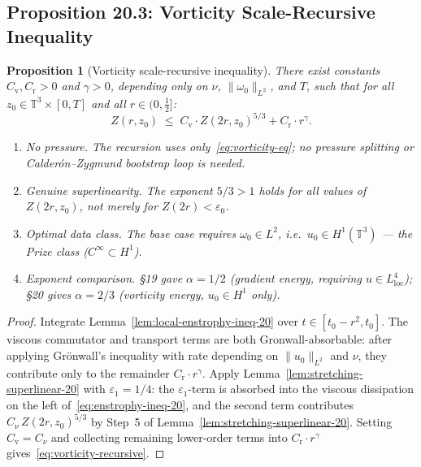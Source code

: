 \documentclass[11pt]{article}
\newtheorem{proposition}[theorem]{Proposition}
\theoremstyle{definition}
\theoremstyle{remark}
\newcommand{\T}{\mathbb{T}}
\begin{document}
\subsection{Proposition 20.3: Vorticity Scale-Recursive Inequality}

\begin{proposition}[Vorticity scale-recursive inequality]
  \label{prop:vorticity-recursive-20}
  There exist constants $C_{\mathrm{v}}, C_{\mathrm{r}} > 0$ and $\gamma > 0$,
  depending only on $\nu$, $\|\omega_0\|_{L^2}$, and $T$, such that for all
  $z_0\in\T^3\times[0,T]$ and all $r\in(0,\tfrac{1}{2}]$:
  \begin{equation}\label{eq:vorticity-recursive}
    Z(r,z_0) \;\leq\; C_{\mathrm{v}}\cdot Z(2r,z_0)^{5/3} + C_{\mathrm{r}}\cdot r^\gamma.
  \end{equation}
  \begin{enumerate}[label=(\alph*)]
    \item \emph{No pressure.}  The recursion uses only~\eqref{eq:vorticity-eq};
    no pressure splitting or Calderón--Zygmund bootstrap loop is needed.
    \item \emph{Genuine superlinearity.}  The exponent $5/3>1$ holds for
    \emph{all} values of $Z(2r,z_0)$, not merely for $Z(2r)<\varepsilon_0$.
    \item \emph{Optimal data class.}  The base case requires $\omega_0\in L^2$,
    i.e.\ $u_0\in H^1(\T^3)$ — the Prize class ($C^\infty\subset H^1$).
    \item \emph{Exponent comparison.}  §19 gave $\alpha=1/2$ (gradient energy,
    requiring $u\in L^4_{\mathrm{loc}}$); §20 gives $\alpha=2/3$ (vorticity
    energy, $u_0\in H^1$ only).
  \end{enumerate}
\end{proposition}

\begin{proof}
  Integrate Lemma~\ref{lem:local-enstrophy-ineq-20} over $t\in[t_0-r^2,t_0]$.
  The viscous commutator and transport terms are both Gronwall-absorbable:
  after applying Grönwall's inequality with rate depending on $\|u_0\|_{L^2}$
  and $\nu$, they contribute only to the remainder $C_{\mathrm{r}}\cdot r^\gamma$.
  Apply Lemma~\ref{lem:stretching-superlinear-20} with $\varepsilon_1=1/4$:
  the $\varepsilon_1$-term is absorbed into the viscous dissipation on the left
  of~\eqref{eq:enstrophy-ineq-20}, and the second term contributes
  $C_\nu\,Z(2r,z_0)^{5/3}$ by Step~5 of Lemma~\ref{lem:stretching-superlinear-20}.
  Setting $C_{\mathrm{v}}=C_\nu$ and collecting remaining lower-order terms
  into $C_{\mathrm{r}}\cdot r^\gamma$ gives~\eqref{eq:vorticity-recursive}.
\end{proof}
\end{document}
